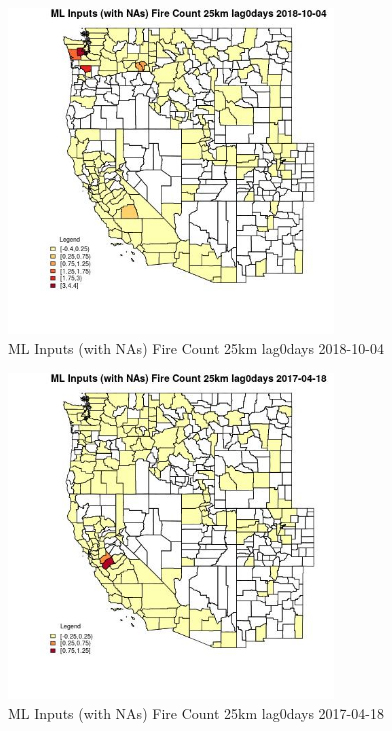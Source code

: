 \begin{figure} 
\centering  
\includegraphics[width=0.77\textwidth]{Code_Outputs/Report_ML_input_PM25_Step4_part_f_de_duplicated_aveswNAs_CountyFire_Count_25km_lag0daysMean2018-10-04.jpg} 
\caption{\label{fig:Report_ML_input_PM25_Step4_part_f_de_duplicated_aveswNAsCountyFire_Count_25km_lag0daysMean2018-10-04}ML Inputs (with NAs) Fire Count 25km lag0days 2018-10-04} 
\end{figure} 
 

\begin{figure} 
\centering  
\includegraphics[width=0.77\textwidth]{Code_Outputs/Report_ML_input_PM25_Step4_part_f_de_duplicated_aveswNAs_CountyFire_Count_25km_lag0daysMean2017-04-18.jpg} 
\caption{\label{fig:Report_ML_input_PM25_Step4_part_f_de_duplicated_aveswNAsCountyFire_Count_25km_lag0daysMean2017-04-18}ML Inputs (with NAs) Fire Count 25km lag0days 2017-04-18} 
\end{figure} 
 

